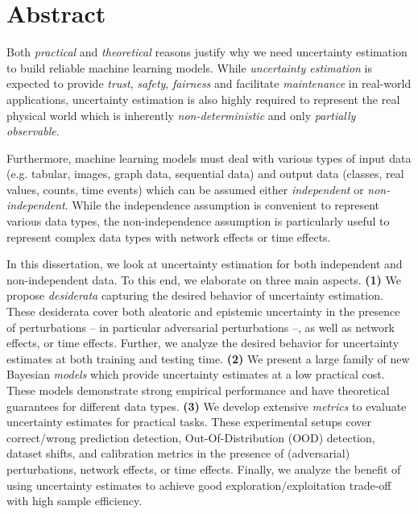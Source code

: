\chapter*{Abstract}
%

Both \emph{practical} and \emph{theoretical} reasons justify why we need uncertainty estimation to build reliable machine learning models. While \emph{uncertainty estimation} is expected to provide \emph{trust}, \emph{safety}, \emph{fairness} and facilitate \emph{maintenance} in real-world applications, uncertainty estimation is also highly required to represent the real physical world which is inherently \emph{non-deterministic} and only \emph{partially observable}. 

Furthermore, machine learning models must deal with various types of input data (e.g. tabular, images, graph data, sequential data) and output data (classes, real values, counts, time events) which can be assumed either \emph{independent} or \emph{non-independent}. While the independence assumption is convenient to represent various data types, the non-independence assumption is particularly useful to represent complex data types with network effects or time effects.

In this dissertation, we look at uncertainty estimation for both independent and non-independent data. To this end, we elaborate on three main aspects. \textbf{(1)} We propose \emph{desiderata} capturing the desired behavior of uncertainty estimation. These desiderata cover both aleatoric and epistemic uncertainty in the presence of perturbations -- in particular adversarial perturbations --, as well as network effects, or time effects. Further, we analyze the desired behavior for uncertainty estimates at both training and testing time. \textbf{(2)} We present a large family of new Bayesian \emph{models} which provide uncertainty estimates at a low practical cost. These models demonstrate strong empirical performance and have theoretical guarantees for different data types. \textbf{(3)} We develop extensive \emph{metrics} to evaluate uncertainty estimates for practical tasks. These experimental setups cover correct/wrong prediction detection, Out-Of-Distribution (OOD) detection, dataset shifts, and calibration metrics in the presence of (adversarial) perturbations, network effects, or time effects. Finally, we analyze the benefit of using uncertainty estimates to achieve good exploration/exploitation trade-off with high sample efficiency.
